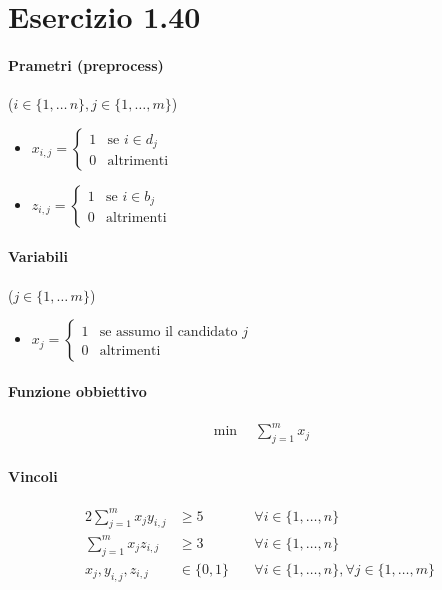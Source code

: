 \documentclass{article}
\begin{document}
\pagebreak
\section{Esercizio 1.40}

\paragraph{Prametri (preprocess)} ($i \in \{1,\ldots\,n\}, j \in \{1,\ldots,m\}$)
\begin{itemize}
  \item $x_{i,j} = \begin{cases}
    1 &\text{se }i \in d_j\\
    0 &\text{altrimenti}
  \end{cases}$
  \item $z_{i,j} = \begin{cases}
    1 &\text{se }i \in b_j\\
    0 &\text{altrimenti}
  \end{cases}$
\end{itemize}

\paragraph{Variabili} ($j \in \{1,\ldots\,m\}$)
\begin{itemize}
  \item $x_j = \begin{cases}
    1 &\text{se assumo il candidato }j\\
    0 &\text{altrimenti}
  \end{cases}$
\end{itemize}

\paragraph{Funzione obbiettivo}
\begin{align*}
  \min \quad \sum_{j=1}^m x_j
\end{align*}

\paragraph{Vincoli}
\begin{alignat}{2}
  \sum_{j=1}^m x_j y_{i,j} &\geq 5 &\forall i \in \{1,\ldots,n\} \\
  \sum_{j=1}^m x_j z_{i,j} &\geq 3 &\forall i \in \{1,\ldots,n\} \\
  x_j, y_{i,j}, z_{i,j} &\in \{0,1\} \quad &\forall i \in \{1,\ldots,n\}, \forall j \in \{1,\ldots,m\}
\end{alignat}
\end{document}
